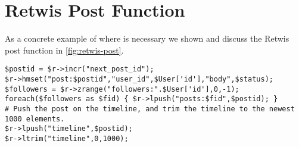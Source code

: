 \section{Retwis Post Function}
\label{sec:retwis-post}
As a concrete example of where \mdl{} is necessary we shown and discuss the Retwis post function in \cref{fig:retwis-post}.
\begin{figure*}[t!]
\begin{verbatim}
$postid = $r->incr("next_post_id");
$r->hmset("post:$postid","user_id",$User['id'],"body",$status);
$followers = $r->zrange("followers:".$User['id'],0,-1);
foreach($followers as $fid) { $r->lpush("posts:$fid",$postid); }
# Push the post on the timeline, and trim the timeline to the newest 1000 elements.
$r->lpush("timeline",$postid);
$r->ltrim("timeline",0,1000);
\end{verbatim}
\caption{The Retwis post function creates a new post and adds a reference to it in each of the timelines of a the poster's followers, as well as a global timeline. It also truncates the global timeline to the 1000 most recent posts. As written, each operation must complete before initiating the next, resulting in many round trips to the datastore. Most of these operations have no data- or control-flow dependencies on each other. However, they cannot be naively parallelized, as many of them \emph{must} occur in a particular order. For example, the post id must appear in any timelines until the post is created.}
\label{fig:retwis-post}
\end{figure*}